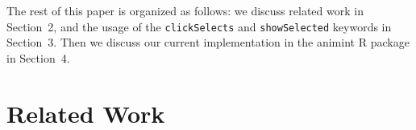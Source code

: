 \documentclass[12pt]{article}\usepackage[]{graphicx}\usepackage[]{color}
\begin{document}



The rest of this paper is organized as follows: we discuss related
work in Section~2, and the usage of the \texttt{clickSelects} and
\texttt{showSelected} keywords in Section~3. Then we discuss our
current implementation in the animint R package in Section~4.


\section{Related Work}
\end{document}

